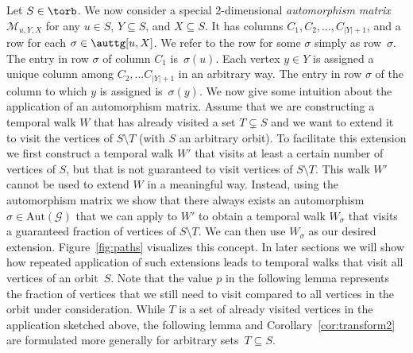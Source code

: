     Let $S \in \torb$. We now consider a special 2-dimensional
    \textit{automorphism matrix $\mathcal{M}_{u, Y, X}$} for {any $u\in S$, $Y\subseteq S$, and $X \subseteq S$.}
    {It has} columns $C_1, C_2,
    \ldots, C_{|Y|+1}$, and a row for each $\sigma \in \auttg[u,X]$.
    We refer to the row for some $\sigma$ simply as row~$\sigma$.
    {The entry in row $\sigma$ of column $C_1$ is~$\sigma(u)$.}
    {Each vertex $y\in Y$ is assigned a unique column among $C_2,
    \ldots C_{|Y|+1}$ in an arbitrary way. The entry in row $\sigma$ of the
    column to which $y$ is assigned is~$\sigma(y)$.} We now give some intuition
    about the application of an automorphism matrix. Assume that we are
    constructing a temporal walk $W$ that has already visited a set $T
    \subsetneq S$ and we want to extend it to visit the vertices of $S \setminus
    T$ (with $S$ an arbitrary orbit). To facilitate this extension we first
    construct a temporal walk $W'$ that visits at least a certain number of
    vertices of $S$, but that is not guaranteed to visit vertices of $S
    \setminus T$. This walk $W'$ cannot be used to extend $W$ in a meaningful
    way. Instead, using the automorphism matrix we show that there always exists
    an automorphism $\sigma \in \text{Aut}(\mathcal{G})$ that we can apply to
    $W'$ to obtain a temporal walk $W_{\sigma}$ that visits a guaranteed
    fraction of vertices of $S \setminus T$. We can then use $W_{\sigma}$ as our
    desired extension. {Figure~\ref{fig:paths} visualizes this concept.} In
    later sections we will show how repeated application of such extensions
    leads to temporal walks that visit all vertices of an orbit~$S$. Note that
    the value $p$ in the following lemma represents the fraction of vertices
    that we still need to visit compared to all vertices in the orbit under
    consideration.
	{While $T$ is a set of already visited vertices in the application
	sketched above, the following lemma and Corollary~\ref{cor:transform2}
	are formulated more generally for arbitrary sets~$T\subseteq S$.}

